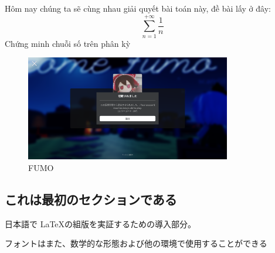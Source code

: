 \documentclass{article}
\begin{document}
Hôm nay chúng ta sẽ cùng nhau giải quyết bài toán này, đề bài lấy ở đây:
\begin{equation}
    \sum_{n=1}^{+\infty}\frac{1}{n}
\end{equation}
Chứng minh chuỗi số trên phân kỳ
\begin{figure}
    \centering
    \includegraphics[width=0.8\textwidth]{fumo.png}
    \caption{FUMO}
\end{figure}
\begin{CJK}{UTF8}{min}
    \section{これは最初のセクションである}
    日本語で \LaTeX の組版を実証するための導入部分。
    
    フォントはまた、数学的な形態および他の環境で使用することができる
    \end{CJK}
\end{document}
